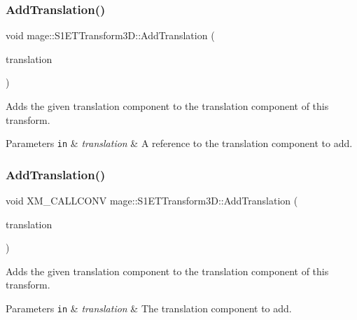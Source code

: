 \subsubsection{\texorpdfstring{Add\+Translation()}{AddTranslation()}\hspace{0.1cm}{\footnotesize\ttfamily [2/3]}}
{\footnotesize\ttfamily void mage\+::\+S1\+E\+T\+Transform3\+D\+::\+Add\+Translation (\begin{DoxyParamCaption}\item[{const \mbox{\hyperlink{namespacemage_a1e3c7a882af461f161caa1cbddaf1fa2}{F32x3}} \&}]{translation }\end{DoxyParamCaption})\hspace{0.3cm}{\ttfamily [noexcept]}}

Adds the given translation component to the translation component of this transform.


\begin{DoxyParams}[1]{Parameters}
\mbox{\tt in}  & {\em translation} & A reference to the translation component to add. \\
\hline
\end{DoxyParams}
\mbox{\label{classmage_1_1_s1_e_t_transform3_d_a3111eb30105391f51e417e81d36abc01}} 
\subsubsection{\texorpdfstring{Add\+Translation()}{AddTranslation()}\hspace{0.1cm}{\footnotesize\ttfamily [3/3]}}
{\footnotesize\ttfamily void X\+M\+\_\+\+C\+A\+L\+L\+C\+O\+NV mage\+::\+S1\+E\+T\+Transform3\+D\+::\+Add\+Translation (\begin{DoxyParamCaption}\item[{F\+X\+M\+V\+E\+C\+T\+OR}]{translation }\end{DoxyParamCaption})\hspace{0.3cm}{\ttfamily [noexcept]}}

Adds the given translation component to the translation component of this transform.


\begin{DoxyParams}[1]{Parameters}
\mbox{\tt in}  & {\em translation} & The translation component to add. \\
\hline
\end{DoxyParams}
\mbox{\label{classmage_1_1_s1_e_t_transform3_d_a97229be16985e872818a031401c94952}} 
